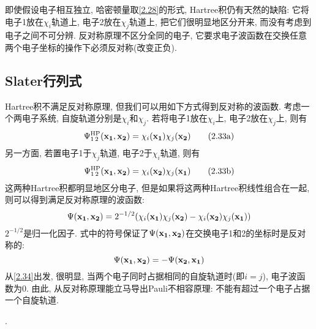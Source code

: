 即使假设电子相互独立, 哈密顿量取\ref{2.28}的形式, Hartree积仍有天然的缺陷: 它将电子1放在$\chi_i$轨道上, 电子2放在$\chi_j$轨道上, 把它们很明显地区分开来, 而没有考虑到电子之间不可分辨. 反对称原理不区分全同的电子, 它要求电子波函数在交换任意两个电子坐标的操作下必须反对称(改变正负).
\subsection{Slater行列式}
 \label{sec2.2.3}
Hartree积不满足反对称原理, 但我们可以用如下方式得到反对称的波函数. 考虑一个两电子系统, 自旋轨道分别是$\chi_i$和$\chi_j$. 若将电子1放在$\chi_i$上, 电子2放在$\chi_j$上, 则有
\begin{equation}
\begin{subequations}
\Psi^{\rm HP}_{1\,2}(\bo{x_1,x_2})=\chi_i(\bo{x_1})\chi_j(\bo{x_2})\tag{2.33a}
\end{subequations}
\end{equation}
另一方面, 若置电子1于$\chi_j$轨道, 电子2于$\chi_i$轨道, 则有
\begin{equation*}
\addtocounter{equation}{-1}
\Psi^{\rm HP}_{1\,2}(\bo{x_1,x_2})=\chi_i(\bo{x_2})\chi_j(\bo{x_1})\tag{2.33b}
\end{equation*}
这两种Hartree积都明显地区分电子, 但是如果将这两种Hartree积线性组合在一起, 则可以得到满足反对称原理的波函数:
\begin{equation}
\label{2.34}
\Psi(\mathbf{x_1,x_2})=2^{-1/2}(\chi_i(\mathbf{x_1})\chi_j(\mathbf{x_2})-\chi_i(\mathbf{x_2})\chi_j(\mathbf{x_1}))
\end{equation}
$2^{-1/2}$是归一化因子. 式中的符号保证了$\Psi(\mathbf{x_1,x_2})$在交换电子1和2的坐标时是反对称的:
\begin{equation}
\Psi(\mathbf{x_1,x_2})=-\Psi(\mathbf{x_2,x_1})
\end{equation}
从\ref{2.34}出发, 很明显, 当两个电子同时占据相同的自旋轨道时(即$i=j$), 电子波函数为0. 由此, 从反对称原理能立马导出Pauli不相容原理: 不能有超过一个电子占据一个自旋轨道.

.

